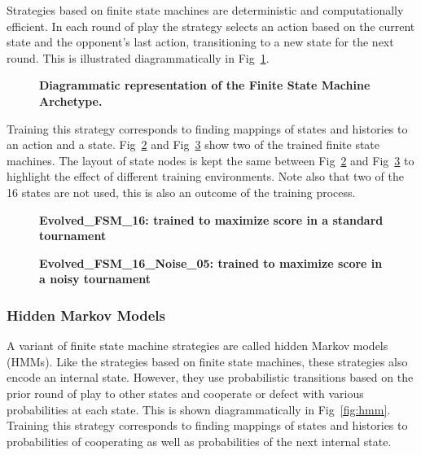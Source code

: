 \documentclass[10pt,letterpaper]{article}
\begin{document}
Strategies based on finite state machines are deterministic and computationally efficient.
In each round of play the strategy selects an action based on the current state
and the opponent's last action, transitioning to a new state for the next round.
This is illustrated diagrammatically in Fig~\ref{fig:fsm}.

\begin{figure}[!hbtp]
    \centering
    \caption{\bf Diagrammatic representation of the Finite State Machine Archetype.}
    \label{fig:fsm}
\end{figure}

Training this strategy corresponds to finding mappings of states and histories
to an action and a state. Fig~\ref{fig:fsm16} and Fig~\ref{fig:fsm16noise} show
two of the trained
finite state machines. The layout of state nodes is kept the same between
Fig~\ref{fig:fsm16} and Fig~\ref{fig:fsm16noise} to highlight the effect of
different training environments. Note also that two of the 16 states are not
used, this is also an outcome of the training process.


\begin{figure}[!hbtp]
    \centering
        \caption{\bf Evolved\_FSM\_16: trained to maximize score in a standard
        tournament}
        \label{fig:fsm16}
\end{figure}

\begin{figure}
        \centering
        \caption{\bf Evolved\_FSM\_16\_Noise\_05: trained to maximize score in a
        noisy tournament}
        \label{fig:fsm16noise}
\end{figure}


\subsubsection*{Hidden Markov Models}\label{sec:hmm}

A variant of finite state machine strategies are called hidden Markov models
(HMMs). Like the strategies based on finite state machines, these strategies
also encode an internal state. However, they use probabilistic transitions based on the
prior round of play to other states and cooperate or defect with various
probabilities at each state. This is
shown diagrammatically in Fig~\ref{fig:hmm}. Training this strategy
corresponds to finding mappings of states and histories to probabilities of
cooperating as well as probabilities of the next internal state.
\end{document}
